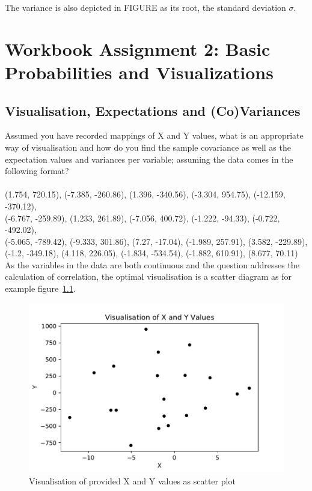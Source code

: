 The variance is also depicted in FIGURE as its root, the standard deviation $\sigma$. 


\chapter{Workbook Assignment 2: Basic Probabilities and Visualizations }	

\section{Visualisation, Expectations and (Co)Variances}
Assumed you have recorded mappings of X and Y values, what is an appropriate way of visualisation and how do you find the sample covariance as well as the expectation values and variances per variable; assuming the data comes in the following format?\\
\\
(1.754, 720.15), (-7.385, -260.86), (1.396, -340.56), (-3.304, 954.75), 
(-12.159, -370.12),\\ (-6.767, -259.89), (1.233, 261.89), (-7.056, 400.72), 
(-1.222, -94.33), (-0.722, -492.02),\\ (-5.065, -789.42), (-9.333, 301.86), 
(7.27, -17.04), (-1.989, 257.91), (3.582, -229.89), \\(-1.2, -349.18), 
(4.118, 226.05), (-1.834, -534.54), (-1.882, 610.91), (8.677, 70.11) \\

As the variables in the data are both continuous and the question addresses the calculation of correlation, the optimal visualisation is a scatter diagram as for example figure~\ref{fig:WorkbookAssignment2a}.

\begin{figure}[h]
\centering
\includegraphics[width=16cm]{pics/WorkbookAssignment2a.pdf}
\caption{Visualisation of provided X and Y values as scatter plot}
\label{fig:WorkbookAssignment2a}
\end{figure}
\FloatBarrier

